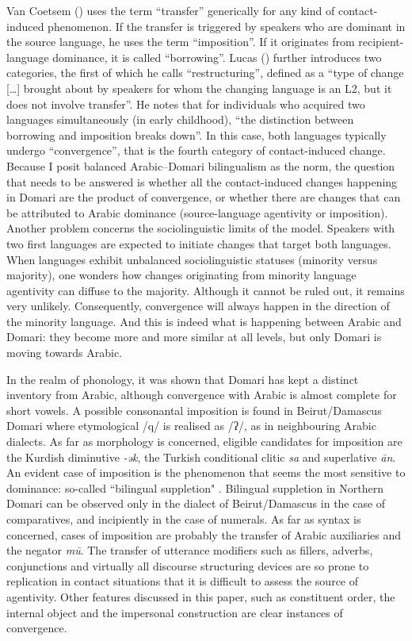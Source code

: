 \documentclass[output=paper]{langsci/langscibook}
\begin{document}
Van Coetsem (\citeyear{VanCoetsem1988,VanCoetsem2000}) uses the term “transfer” generically for any kind of contact-induced phenomenon. If the transfer is triggered by speakers who are dominant in the source language, he uses the term “imposition”. If it originates from recipient-language dominance, it is called “borrowing”. Lucas (\citeyear[525]{Lucas2015}) further introduces two categories, the first of which he calls ``restructuring'', defined as a “type of change […] brought about by speakers for whom the changing language is an L2, but it does not involve transfer”.  He notes that for individuals who acquired two languages simultaneously (in early childhood), “the distinction between borrowing and imposition breaks down”. In this case, both languages typically undergo ``convergence'', that is the fourth category of contact-induced change. Because I posit balanced Arabic--Domari bilingualism as the norm, the question that needs to be answered is whether all the contact-induced changes happening in Domari are the product of convergence, or whether there are changes that can be attributed to Arabic dominance (source-language agentivity or imposition). Another problem concerns the sociolinguistic limits of the model. Speakers with two first languages are expected to initiate changes that target both languages. When languages exhibit unbalanced sociolinguistic statuses (minority versus majority), one wonders how changes originating from minority language agentivity can diffuse to the majority. Although it cannot be ruled out, it remains very unlikely. Consequently, convergence will always happen in the direction of the minority language. And this is indeed what is happening between Arabic and Domari: they become more and more similar at all levels, but only Domari is moving towards Arabic.

In the realm of phonology, it was shown that Domari has kept a distinct inventory from Arabic, although convergence with Arabic is almost complete for short vowels. A possible consonantal imposition is found in Beirut/Damascus Domari where etymological /q/ is realised as /ʔ/, as in neighbouring Arabic dialects. As far as morphology is concerned, eligible candidates for imposition are the Kurdish diminutive \textit{{}-ək}, the Turkish conditional clitic \textit{sa} and superlative \textit{ān}. An evident case of imposition is the phenomenon that seems the most sensitive to dominance: so-called ``bilingual suppletion" \citep{Matras2012}. Bilingual suppletion in Northern Domari can be observed only in the dialect of Beirut/Damascus in the case of comparatives, and incipiently in the case of numerals. As far as syntax is concerned, cases of imposition are probably the transfer of Arabic auxiliaries and the negator \textit{mū}. The transfer of utterance modifiers such as fillers, adverbs, conjunctions and virtually all discourse structuring devices are so prone to replication in contact situations \citep{Matras1998} that it is difficult to assess the source of agentivity. Other features discussed in this paper, such as constituent order, the internal object and the impersonal construction are clear instances of convergence.
\end{document}

